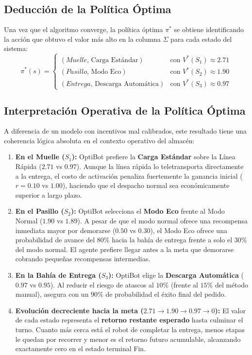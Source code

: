 \subsection{Deducción de la Política Óptima}
Una vez que el algoritmo converge, la política óptima $\pi^*$ se obtiene identificando la acción que obtuvo el valor más alto en la columna $\Sigma$ para cada estado del sistema:
\begin{equation}
  \pi^*(s) = \begin{cases}
    (Muelle, \, \text{Carga Estándar}) & \text{con } V^*(S_1) \approx 2.71 \\
    (Pasillo, \, \text{Modo Eco})      & \text{con } V^*(S_2) \approx 1.90 \\
    (Entrega, \, \text{Descarga Automática}) & \text{con } V^*(S_3) \approx 0.97
  \end{cases}
\end{equation}

\subsection*{Interpretación Operativa de la Política Óptima}
A diferencia de un modelo con incentivos mal calibrados, este resultado tiene una coherencia lógica absoluta en el contexto operativo del almacén:
\begin{enumerate}
  \item \textbf{En el Muelle ($S_1$):} OptiBot prefiere la \textbf{Carga Estándar} sobre la Línea Rápida ($2.71$ vs $0.97$). Aunque la línea rápida lo teletransporta directamente a la entrega, el costo de activación penaliza fuertemente la ganancia inicial ($r = 0.10$ vs $1.00$), haciendo que el despacho normal sea económicamente superior a largo plazo.
  \item \textbf{En el Pasillo ($S_2$):} OptiBot selecciona el \textbf{Modo Eco} frente al Modo Normal ($1.90$ vs $1.89$). A pesar de que el modo normal ofrece una recompensa inmediata mayor por demorarse ($0.50$ vs $0.30$), el Modo Eco ofrece una probabilidad de avance del $80\%$ hacia la bahía de entrega frente a solo el $30\%$ del modo normal. El agente prefiere llegar antes a la meta que demorarse cobrando pequeñas recompensas intermedias.
  \item \textbf{En la Bahía de Entrega ($S_3$):} OptiBot elige la \textbf{Descarga Automática} ($0.97$ vs $0.95$). Al reducir el riesgo de atascos al $10\%$ (frente al $15\%$ del método manual), asegura con un $90\%$ de probabilidad el éxito final del pedido.
  \item \textbf{Evolución decreciente hacia la meta ($2.71 \to 1.90 \to 0.97 \to 0$):} El valor de cada estado representa el \textbf{retorno restante esperado} hasta culminar el turno. Cuanto más cerca está el robot de completar la entrega, menos etapas le quedan por recorrer y menor es el retorno futuro acumulable, alcanzando exactamente cero en el estado terminal Fin.
\end{enumerate}

